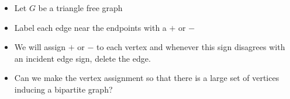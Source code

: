 


\begin{itemize}
	\item Let $G$ be a triangle free graph
	\item Label each edge near the endpoints with a $+$ or $-$
	\item We will assign $+$ or $-$ to each vertex and whenever this sign disagrees with an incident edge sign, delete the edge.
	\item Can we make the vertex assignment so that there is a large set of vertices inducing a bipartite graph?
\end{itemize}


